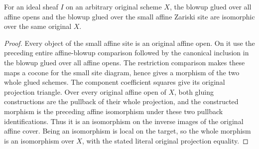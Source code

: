 \begin{theorem}
\label{thm:fc-hironaka-dejong-global-blowup-comparison}
\leanok
{}
For an ideal sheaf $I$ on an arbitrary original scheme $X$, the
blowup glued over all affine opens and the blowup glued over the
small affine Zariski site are isomorphic over the same original $X$.
\end{theorem}
\begin{proof}
Every object of the small affine site is an original affine open.
On it use the preceding entire affine-blowup comparison followed by
the canonical inclusion in the blowup glued over all affine opens.
The restriction comparison makes these maps a cocone for the small
site diagram, hence gives a morphism of the two whole glued schemes.
The component coefficient squares give its original projection
triangle.  Over every original affine open of $X$, both gluing
constructions are the pullback of their whole projection, and the
constructed morphism is the preceding affine isomorphism under
these two pullback identifications.  Thus it is an isomorphism on the
inverse images of the original affine cover.  Being an isomorphism
is local on the target, so the whole morphism is an isomorphism over
$X$, with the stated literal original projection equality.
\end{proof}
